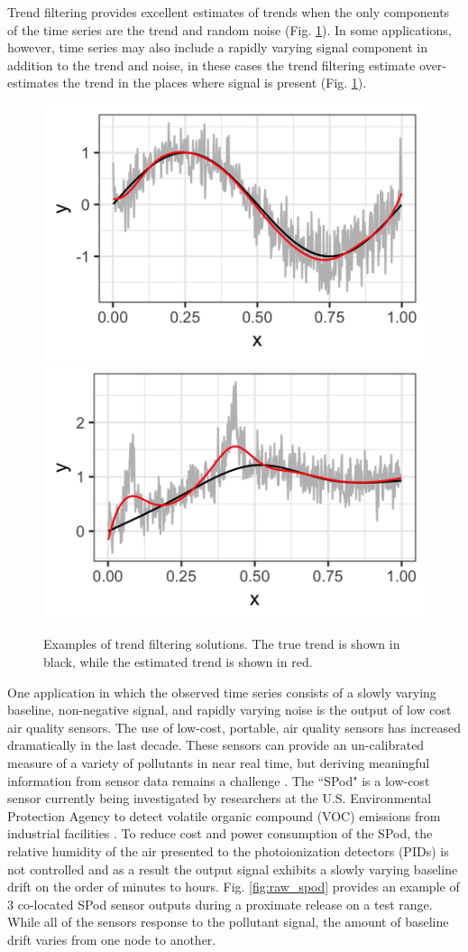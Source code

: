 \documentclass[12pt]{article}
\begin{document}
	Trend filtering provides excellent estimates of trends when the only components of the time series are the trend and random noise (Fig. \ref{fig:trendfilter}). In some applications, however, time series may also include a rapidly varying signal component in addition to the trend and noise, in these cases the trend filtering estimate over-estimates the trend in the places where signal is present (Fig. \ref{fig:trendfilter}).  
	   	
	\begin{figure}
		\centering
		\caption{Examples of trend filtering solutions. The true trend is shown in black, while the estimated trend is shown in red.}
		\includegraphics[width = 0.45\linewidth]{Figures/trend_filter_eg1.png}
		\includegraphics[width = 0.45\linewidth]{Figures/trend_filter_eg2.png}
		\label{fig:trendfilter}
	\end{figure}
	 
	
	One application in which the observed time series consists of a slowly varying baseline, non-negative signal, and rapidly varying noise is the output of low cost air quality sensors. The use of low-cost, portable, air quality sensors has increased dramatically in the last decade. These sensors can provide an un-calibrated measure of a variety of pollutants in near real time, but deriving meaningful information from sensor data remains a challenge \citep{snyder2013changing}. The ``SPod" is a low-cost sensor currently being investigated by researchers at the U.S. Environmental Protection Agency to detect volatile organic compound (VOC) emissions from industrial facilities \citep{thoma2016south}. To reduce cost and power consumption of the SPod, the relative humidity of the air presented to the photoionization detectors (PIDs) is not controlled and as a result the output signal exhibits a slowly varying baseline drift on the order of minutes to hours. Fig. \ref{fig:raw_spod} provides an example of 3 co-located SPod sensor outputs during a proximate release on a test range. While all of the sensors response to the pollutant signal, the amount of baseline drift varies from one node to another.
	 
\end{document}
